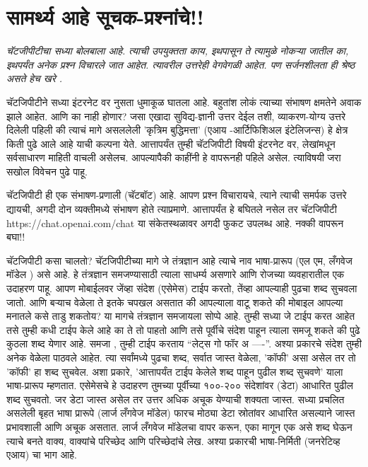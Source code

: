 \chapter{सामर्थ्य आहे सूचक-प्रश्नांचे!!}

{\textit{चॅटजीपीटीचा सध्या बोलबाला आहे.  त्याची उपयुक्तता काय,  इथपासून ते त्यामुळे नोकऱ्या जातील का,  इथपर्यंत अनेक प्रश्न विचारले जात आहेत.  त्यावरील उत्तरेही वेगवेगळी आहेत.  पण सर्जनशीलता ही श्रेष्ठ असते हेच खरे .  }}

\vspace{1.5em}

चॅटजिपीटीने सध्या इंटरनेट वर नुसता धुमाकूळ घातला आहे. बहुतांश लोकं त्याच्या संभाषण क्षमतेने अवाक झाले आहेत. आणि का नाही होणार? जसा एखादा सुविद्य-ज्ञानी उत्तर देईल तशी, व्याकरण-योग्य उत्तरे दिलेली पहिली की त्याचं मागे असललेली 'कृत्रिम बुद्धिमत्ता' (एआय -आर्टिफिशिअल इंटेलिजन्स) हे क्षेत्र किती पुढे आले आहे याची कल्पना येते. आत्तापर्यंत तुम्ही चॅटजिपीटी विषयी इंटरनेट वर, लेखांमधून सर्वसाधारण माहिती वाचली असेलच. आपल्यापैकी काहींनी हे वापरूनही पहिले असेल. त्याविषयी जरा सखोल विवेचन पुढे पाहू.

चॅटजिपीटी ही एक संभाषण-प्रणाली (चॅटबॉट) आहे. आपण प्रश्न विचारायचे, त्याने त्याची समर्पक उत्तरे द्यायची, अगदी दोन व्यक्तीमध्ये संभाषण होते त्याप्रमाणे. आत्तापर्यंत हे बघितले नसेल तर चॅटजिपीटी https://chat.openai.com/chat या संकेतस्थळावर अगदी फुकट उपलब्ध आहे. नक्की वापरून बघा!!

चॅटजिपीटी कसा चालतो?
चॅटजिपीटीच्या मागे जे तंत्रज्ञान आहे त्याचे नाव भाषा-प्रारूप (एल एम, लँगवेज मॉडेल ) असे आहे. हे तंत्रज्ञान समजण्यासाठी त्याला साधर्म्य असणारे आणि रोजच्या व्यवहारातील एक उदाहरण पाहू. आपण मोबाईलवर जेंव्हा संदेश (एसेमेस) टाईप करतो, तेंव्हा आपल्याही पुढचा शब्द सुचवला जातो. आणि बऱ्याच वेळेला ते इतके चपखल असतात की आपल्याला वाटू शकते की मोबाइल आपल्या मनातले कसे ताडु शकतोय? या मागचे तंत्रज्ञान समजायला सोप्पे आहे. तुम्ही सध्या जे टाईप करत आहेत तसे तुम्ही कधी टाईप केले आहे का ते तो पाहतो आणि तसे पूर्वीचे संदेश पाहून त्याला समजू शकते की पुढे कुठला शब्द येणार आहे. समजा , तुम्ही टाईप करताय ``लेट्स गो फॉर अ ----''. अश्या प्रकारचे संदेश तुम्ही अनेक वेळेला पाठवले आहेत. त्या सर्वांमध्ये पुढचा शब्द, सर्वात जास्त वेळेला, 'कॉफी' असा असेल तर तो 'कॉफी' हा शब्द सुचवेल. अशा प्रकारे, 'आत्तापर्यंत टाईप केलेले शब्द पाहून पुढील शब्द सुचवणे' याला भाषा-प्रारूप म्हणतात. एसेमेसचे हे उदाहरण तुमच्या पूर्वीच्या १००-२०० संदेशांवर (डेटा) आधारित पुढील शब्द सुचवतो. जर डेटा जास्त असेल तर उत्तर अधिक अचूक येण्याची शक्यता जास्त. सध्या प्रचलित असलेली बृहत भाषा प्रारूपे (लार्ज लँगवेज मॉडेल) फारच मोठ्या डेटा स्रोतांवर आधारित असल्याने जास्त प्रभावशाली आणि अचूक असतात. लार्ज लँगवेज मॉडेलचा वापर करून, एका मागून एक असे शब्द घेऊन त्याचे बनते वाक्य, वाक्यांचे परिच्छेद आणि परिच्छेदांचे लेख. अश्या प्रकारची भाषा-निर्मिती (जनरेटिव्ह एआय) चा भाग आहे.

